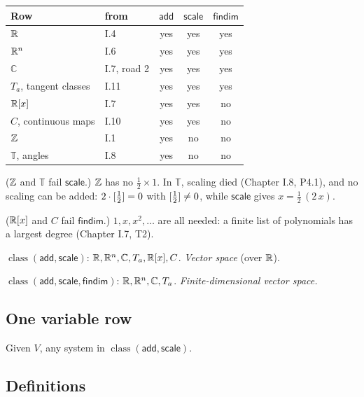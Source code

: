 \begin{center}
\renewcommand{\arraystretch}{1.3}
\begin{tabular}{llccc}
\textbf{Row} & \textbf{from} & $\mathsf{add}$ & $\mathsf{scale}$ & $\mathsf{findim}$ \\ \hline
$\mathbb{R}$ & I.4 & yes & yes & yes \\
$\mathbb{R}^n$ & I.6 & yes & yes & yes \\
$\mathbb{C}$ & I.7, road 2 & yes & yes & yes \\
$T_a$, tangent classes & I.11 & yes & yes & yes \\
$\mathbb{R}[x]$ & I.7 & yes & yes & no \\
$C$, continuous maps & I.10 & yes & yes & no \\
$\mathbb{Z}$ & I.1 & yes & no & no \\
$\mathbb{T}$, angles & I.8 & yes & no & no \\
\end{tabular}
\end{center}

\begin{lines}
\item[\lab{P1}] ($\mathbb{Z}$ and $\mathbb{T}$ fail $\mathsf{scale}$.) $\mathbb{Z}$ has no $\tfrac12 \times 1$. In $\mathbb{T}$, scaling died (Chapter I.8, P4.1), and no scaling can be added: $2 \cdot [\tfrac12] = 0$ with $[\tfrac12] \neq 0$, while $\mathsf{scale}$ gives $x = \tfrac12\,(2\,x)$.
\item[\lab{P2}] ($\mathbb{R}[x]$ and $C$ fail $\mathsf{findim}$.) $1, x, x^2, \dots$ are all needed: a finite list of polynomials has a largest degree (Chapter I.7, T2).
\item[\lab{N1}] $\operatorname{class}(\mathsf{add}, \mathsf{scale})$: $\mathbb{R}, \mathbb{R}^n, \mathbb{C}, T_a, \mathbb{R}[x], C$. \emph{Vector space} (over $\mathbb{R}$).
\item[\lab{N2}] $\operatorname{class}(\mathsf{add}, \mathsf{scale}, \mathsf{findim})$: $\mathbb{R}, \mathbb{R}^n, \mathbb{C}, T_a$. \emph{Finite-dimensional vector space.}
\end{lines}

\subsection*{One variable row}

Given $V$, any system in $\operatorname{class}(\mathsf{add}, \mathsf{scale})$.

\subsection*{Definitions}

